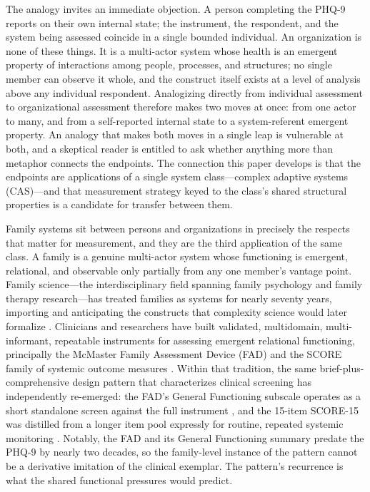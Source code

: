 \documentclass[12pt, letterpaper]{article}
\begin{document}
The analogy invites an immediate objection. A person completing the PHQ-9 reports on their own internal state; the instrument, the respondent, and the system being assessed coincide in a single bounded individual. An organization is none of these things. It is a multi-actor system whose health is an emergent property of interactions among people, processes, and structures; no single member can observe it whole, and the construct itself exists at a level of analysis above any individual respondent. Analogizing directly from individual assessment to organizational assessment therefore makes two moves at once: from one actor to many, and from a self-reported internal state to a system-referent emergent property. An analogy that makes both moves in a single leap is vulnerable at both, and a skeptical reader is entitled to ask whether anything more than metaphor connects the endpoints. The connection this paper develops is that the endpoints are applications of a single system class---complex adaptive systems (CAS)---and that measurement strategy keyed to the class's shared structural properties is a candidate for transfer between them.

Family systems sit between persons and organizations in precisely the respects that matter for measurement, and they are the third application of the same class. A family is a genuine multi-actor system whose functioning is emergent, relational, and observable only partially from any one member's vantage point. Family science---the interdisciplinary field spanning family psychology and family therapy research---has treated families as systems for nearly seventy years, importing and anticipating the constructs that complexity science would later formalize \parencite{jackson1957,minuchin1974,bowen1978,cox1997}. Clinicians and researchers have built validated, multidomain, multi-informant, repeatable instruments for assessing emergent relational functioning, principally the McMaster Family Assessment Device (FAD) and the SCORE family of systemic outcome measures \parencite{epstein1983,stratton2010,stratton2014,hamilton2016}. Within that tradition, the same brief-plus-comprehensive design pattern that characterizes clinical screening has independently re-emerged: the FAD's General Functioning subscale operates as a short standalone screen against the full instrument \parencite{boterhovendehaan2015}, and the 15-item SCORE-15 was distilled from a longer item pool expressly for routine, repeated systemic monitoring \parencite{stratton2010,stratton2014}. Notably, the FAD and its General Functioning summary predate the PHQ-9 by nearly two decades, so the family-level instance of the pattern cannot be a derivative imitation of the clinical exemplar. The pattern's recurrence is what the shared functional pressures would predict.
\end{document}
